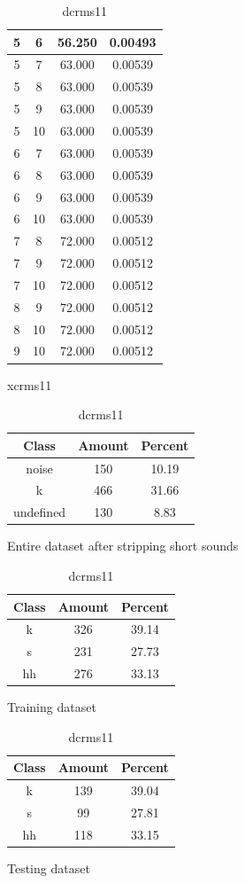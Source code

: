 \begin{table}
\begin{subtable}[tbp]{0.45\textwidth}
{\begin{tabular}{|c|c|c|c|}
 5 & 6 & 56.250 & 0.00493\\ \hline 
 5 & 7 & 63.000 & 0.00539\\ \hline 
 5 & 8 & 63.000 & 0.00539\\ \hline 
 5 & 9 & 63.000 & 0.00539\\ \hline 
 5 & 10 & 63.000 & 0.00539\\ \hline 
 6 & 7 & 63.000 & 0.00539\\ \hline 
 6 & 8 & 63.000 & 0.00539\\ \hline 
 6 & 9 & 63.000 & 0.00539\\ \hline 
 6 & 10 & 63.000 & 0.00539\\ \hline 
 7 & 8 & 72.000 & 0.00512\\ \hline 
 7 & 9 & 72.000 & 0.00512\\ \hline 
 7 & 10 & 72.000 & 0.00512\\ \hline 
 8 & 9 & 72.000 & 0.00512\\ \hline 
 8 & 10 & 72.000 & 0.00512\\ \hline 
 9 & 10 & 72.000 & 0.00512\\ \hline 

\end{tabular}
} \label{xlrms11}
\caption{xcrms11}
\end{subtable}

\begin{subtable}[tbp]{0.45\textwidth}
\centering
\begin{tabular}{|c|c|c|}
\hline
Class & Amount & Percent\\ \hline
noise & 150 & 10.19\\ \hline
k & 466 & 31.66\\ \hline
undefined & 130 & 8.83\\ \hline
\end{tabular}
\caption{Entire dataset after stripping short sounds}
\end{subtable}
\hfill
\begin{subtable}[tbp]{0.45\textwidth}
\centering
\begin{tabular}{|c|c|c|}
\hline
Class & Amount & Percent\\ \hline
k & 326 & 39.14\\ \hline
s & 231 & 27.73\\ \hline
hh & 276 & 33.13\\ \hline
\end{tabular}
\caption{Training dataset}
\end{subtable}
\hfill
\begin{subtable}[tbp]{0.45\textwidth}
\centering
\begin{tabular}{|c|c|c|}
\hline
Class & Amount & Percent\\ \hline
k & 139 & 39.04\\ \hline
s & 99 & 27.81\\ \hline
hh & 118 & 33.15\\ \hline
\end{tabular}
\caption{Testing dataset}
\end{subtable}
\hfill

\label{dlrms11}

\caption{dcrms11}

\end{table}